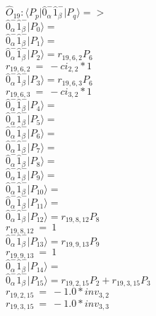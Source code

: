 \documentclass[14pt]{article}
\begin{document}
    $\hat{O}_{19}:  \langle{P_p}\vert \hat{0}_{\alpha}^{-}\hat{1}_{\beta}^{-} \vert{P_q}\rangle => $ \\ 
    $ \hat{0}_{\alpha}^{-}\hat{1}_{\beta}^{-} \vert{P_{0}}\rangle =  $ \\ 
    $ \hat{0}_{\alpha}^{-}\hat{1}_{\beta}^{-} \vert{P_{1}}\rangle =  $ \\ 
    $ \hat{0}_{\alpha}^{-}\hat{1}_{\beta}^{-} \vert{P_{2}}\rangle = {r}_{19,6,2}P_{6} $ \\ 
    ${r}_{19,6,2}\ =\ -{ci}_{2,2}*1 $ \\ 
    $ \hat{0}_{\alpha}^{-}\hat{1}_{\beta}^{-} \vert{P_{3}}\rangle = {r}_{19,6,3}P_{6} $ \\ 
    ${r}_{19,6,3}\ =\ -{ci}_{3,2}*1 $ \\ 
    $ \hat{0}_{\alpha}^{-}\hat{1}_{\beta}^{-} \vert{P_{4}}\rangle =  $ \\ 
    $ \hat{0}_{\alpha}^{-}\hat{1}_{\beta}^{-} \vert{P_{5}}\rangle =  $ \\ 
    $ \hat{0}_{\alpha}^{-}\hat{1}_{\beta}^{-} \vert{P_{6}}\rangle =  $ \\ 
    $ \hat{0}_{\alpha}^{-}\hat{1}_{\beta}^{-} \vert{P_{7}}\rangle =  $ \\ 
    $ \hat{0}_{\alpha}^{-}\hat{1}_{\beta}^{-} \vert{P_{8}}\rangle =  $ \\ 
    $ \hat{0}_{\alpha}^{-}\hat{1}_{\beta}^{-} \vert{P_{9}}\rangle =  $ \\ 
    $ \hat{0}_{\alpha}^{-}\hat{1}_{\beta}^{-} \vert{P_{10}}\rangle =  $ \\ 
    $ \hat{0}_{\alpha}^{-}\hat{1}_{\beta}^{-} \vert{P_{11}}\rangle =  $ \\ 
    $ \hat{0}_{\alpha}^{-}\hat{1}_{\beta}^{-} \vert{P_{12}}\rangle = {r}_{19,8,12}P_{8} $ \\ 
    ${r}_{19,8,12}\ =\ 1 $ \\ 
    $ \hat{0}_{\alpha}^{-}\hat{1}_{\beta}^{-} \vert{P_{13}}\rangle = {r}_{19,9,13}P_{9} $ \\ 
    ${r}_{19,9,13}\ =\ 1 $ \\ 
    $ \hat{0}_{\alpha}^{-}\hat{1}_{\beta}^{-} \vert{P_{14}}\rangle =  $ \\ 
    $ \hat{0}_{\alpha}^{-}\hat{1}_{\beta}^{-} \vert{P_{15}}\rangle = {r}_{19,2,15}P_{2}+{r}_{19,3,15}P_{3} $ \\ 
    ${r}_{19,2,15}\ =\ -1.0*{inv}_{3,2} $ \\ 
    ${r}_{19,3,15}\ =\ -1.0*{inv}_{3,3} $ \\ 
    
\end{document}
